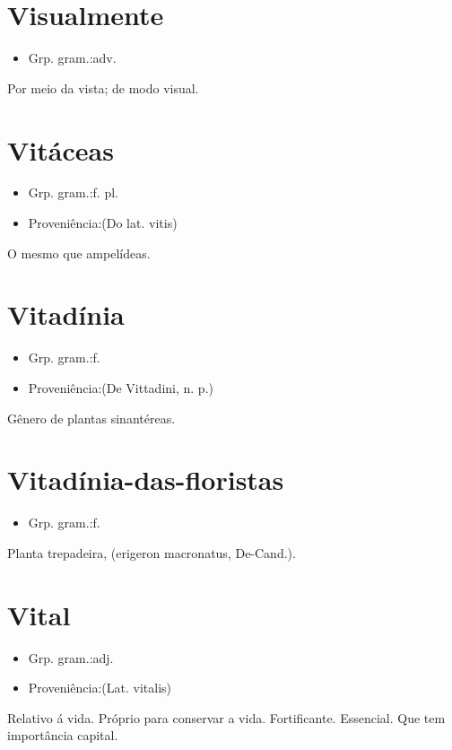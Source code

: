 \documentclass{article}
\begin{document}
\section{Visualmente}
\begin{itemize}
\item {Grp. gram.:adv.}
\end{itemize}
Por meio da vista; de modo visual.
\section{Vitáceas}
\begin{itemize}
\item {Grp. gram.:f. pl.}
\end{itemize}
\begin{itemize}
\item {Proveniência:(Do lat. \textunderscore vitis\textunderscore )}
\end{itemize}
O mesmo que \textunderscore ampelídeas\textunderscore .
\section{Vitadínia}
\begin{itemize}
\item {Grp. gram.:f.}
\end{itemize}
\begin{itemize}
\item {Proveniência:(De \textunderscore Vittadini\textunderscore , n. p.)}
\end{itemize}
Gênero de plantas sinantéreas.
\section{Vitadínia-das-floristas}
\begin{itemize}
\item {Grp. gram.:f.}
\end{itemize}
Planta trepadeira, (\textunderscore erigeron macronatus\textunderscore , De-Cand.).
\section{Vital}
\begin{itemize}
\item {Grp. gram.:adj.}
\end{itemize}
\begin{itemize}
\item {Proveniência:(Lat. \textunderscore vitalis\textunderscore )}
\end{itemize}
Relativo á vida.
Próprio para conservar a vida.
Fortificante.
Essencial.
Que tem importância capital.
\end{document}
